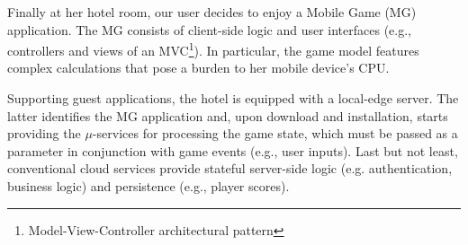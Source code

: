 



Finally at her hotel room, our user 
decides to enjoy a Mobile Game (MG) application. The MG consists of client-side logic and user interfaces (e.g., controllers and views of an MVC\footnote{Model-View-Controller architectural pattern}). In particular, the game model features complex calculations that pose a burden to her mobile device's CPU. 

Supporting guest applications, the hotel is equipped with a local-edge server. The latter identifies the MG application and, upon download and installation, starts providing the $\mu$-services for processing the game state, which must be passed as a parameter in conjunction with game events (e.g., user inputs). Last but not least, conventional cloud services provide stateful server-side logic (e.g. authentication, business logic) and persistence (e.g., player scores).  

